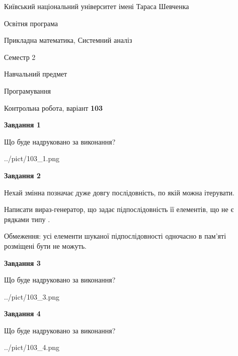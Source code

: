 \documentclass[12pt, ukrainian]{article}
\begin{document}
{{\begin {small}\par
{ \center  Київський національний університет імені Тараса Шевченка \par}
{\parbox {5 cm}{Освітня програма \hfill}{\parbox {8 cm}{Прикладна математика, Системний аналіз \hfill}}\parbox {5 cm}{\hfill Семестр 2}}\par
{\parbox {5 cm} {Навчальний предмет \hfill}\parbox {7 cm}{Програмування \hfill}\parbox {6cm}{\hfill}\par}\vspace{-7pt} \end{small}}{\center Контрольна робота, варіант  \No \textbf
{ 103 }\par}}
{
\begin {large}
{\begin {center}\textbf{Завдання 1}\end {center}}\par
Що буде надруковано за виконання?\par\par
\begin{center}
	{../pict/103_1.png}
\end{center}
\newpage

{\begin {center}\textbf{Завдання 2}\end {center}}\par
Нехай змінна  позначає дуже довгу послідовність, по якій можна ітерувати.

Написати вираз-генератор, що задає підпослідовність її елементів, що не є рядками типу .

Обмеження: усі елементи шуканої підпослідовності одночасно в пам'яті розміщені бути не можуть.\par
\newpage

{\begin {center}\textbf{Завдання 3}\end {center}}\par
Що буде надруковано за виконання?\par
\begin{center}
	{../pict/103_3.png}
\end{center}
\newpage

{\begin {center}\textbf{Завдання 4}\end {center}}\par
Що буде надруковано за виконання?\par
\begin{center}
	{../pict/103_4.png}
\end{center}
\newpage


\end{large}}
\end{document}
